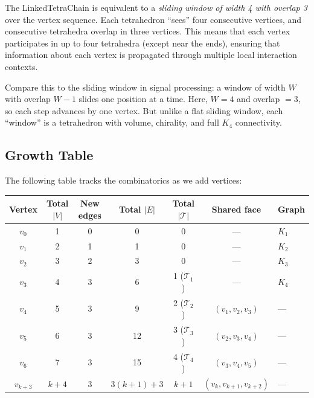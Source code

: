 \begin{keyinsight}
The LinkedTetraChain is equivalent to a \emph{sliding window of width 4 with
overlap 3} over the vertex sequence. Each tetrahedron ``sees'' four consecutive
vertices, and consecutive tetrahedra overlap in three vertices. This means that
each vertex participates in up to four tetrahedra (except near the ends),
ensuring that information about each vertex is propagated through multiple
local interaction contexts.

Compare this to the sliding window in signal processing: a window of width $W$
with overlap $W - 1$ slides one position at a time. Here, $W = 4$ and
overlap $= 3$, so each step advances by one vertex. But unlike a flat sliding
window, each ``window'' is a tetrahedron with volume, chirality, and full $K_4$
connectivity.
\end{keyinsight}

\subsection{Growth Table}

The following table tracks the combinatorics as we add vertices:

\begin{center}
\renewcommand{\arraystretch}{1.15}
\begin{tabular}{ccccccl}
\toprule
\textbf{Vertex} & \textbf{Total $|V|$} & \textbf{New edges} & \textbf{Total $|E|$}
  & \textbf{Total $|\mathcal{T}|$} & \textbf{Shared face} & \textbf{Graph} \\
\midrule
$v_0$         & 1 & 0 & 0  & 0 & --- & $K_1$ \\
$v_1$         & 2 & 1 & 1  & 0 & --- & $K_2$ \\
$v_2$         & 3 & 2 & 3  & 0 & --- & $K_3$ \\
$v_3$         & 4 & 3 & 6  & 1 ($\mathcal{T}_1$) & --- & $K_4$ \\
$v_4$         & 5 & 3 & 9  & 2 ($\mathcal{T}_2$) & $(v_1,v_2,v_3)$ & --- \\
$v_5$         & 6 & 3 & 12 & 3 ($\mathcal{T}_3$) & $(v_2,v_3,v_4)$ & --- \\
$v_6$         & 7 & 3 & 15 & 4 ($\mathcal{T}_4$) & $(v_3,v_4,v_5)$ & --- \\
$v_{k+3}$     & $k{+}4$ & 3 & $3(k{+}1){+}3$ & $k{+}1$ & $(v_k,v_{k+1},v_{k+2})$ & --- \\
\bottomrule
\end{tabular}
\end{center}

